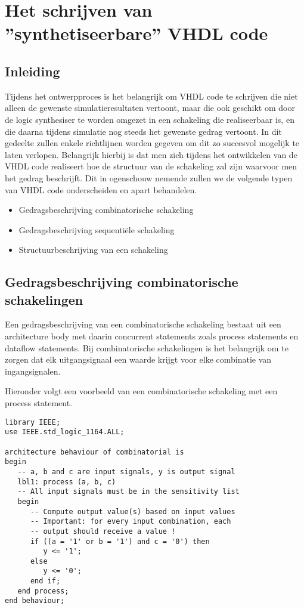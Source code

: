 \section{Het schrijven van ''synthetiseerbare'' VHDL code}
\label{syn_vhdl}

\subsection{Inleiding}

Tijdens het ontwerpproces is het belangrijk om VHDL code te schrijven
die niet alleen de gewenste simulatieresultaten vertoont, maar die
ook geschikt om door de logic synthesiser te worden omgezet in
een schakeling die realiseerbaar is, en die daarna tijdens
simulatie nog steeds het gewenste gedrag vertoont.
In dit gedeelte zullen enkele richtlijnen worden gegeven
om dit zo succesvol mogelijk te laten verlopen.
Belangrijk hierbij is dat men zich tijdens het ontwikkelen
van de VHDL code realiseert hoe de structuur van de schakeling 
zal zijn waarvoor men het gedrag beschrijft.
Dit in ogenschouw nemende zullen we de volgende typen van VHDL 
code onderscheiden en apart behandelen.
\begin{itemize}
\item
Gedragsbeschrijving combinatorische schakeling
\item
Gedragsbeschrijving sequenti\"ele schakeling
\item
Structuurbeschrijving van een schakeling
\end{itemize}

\subsection{Gedragsbeschrijving combinatorische schakelingen}

Een gedragsbeschrijving van een combinatorische schakeling bestaat
uit een architecture body met daarin concurrent statements zoals
process statements en dataflow statements. 
Bij combinatorische schakelingen is het belangrijk om te zorgen
dat elk uitgangsignaal een waarde krijgt voor elke combinatie
van ingangsignalen.

Hieronder volgt een voorbeeld van een combinatorische schakeling 
met een process statement.
\begin{verbatim}
library IEEE;
use IEEE.std_logic_1164.ALL;

architecture behaviour of combinatorial is
begin
   -- a, b and c are input signals, y is output signal
   lbl1: process (a, b, c)
   -- All input signals must be in the sensitivity list
   begin
      -- Compute output value(s) based on input values
      -- Important: for every input combination, each 
      -- output should receive a value !
      if ((a = '1' or b = '1') and c = '0') then
         y <= '1';
      else
         y <= '0';
      end if;
   end process;
end behaviour;
\end{verbatim}

